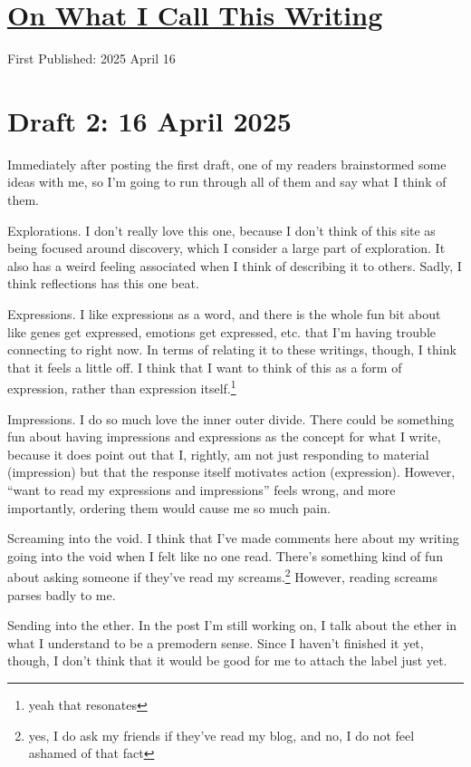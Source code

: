 \documentclass[12pt]{article}
\newcommand{\say}[1]{``#1''}
\renewcommand{\,}{\textsuperscript{,}}
\begin{document}
  
\doublespacing  
\section{\href{verbiage.html}{On What I Call This Writing}}  
First Published: 2025 April 16

\section{Draft 2: 16 April 2025}

Immediately after posting the first draft, one of my readers brainstormed some ideas with me, so I'm going to run through all of them and say what I think of them.

Explorations.  
I don't really love this one, because I don't think of this site as being focused around discovery, which I consider a large part of exploration.  
It also has a weird feeling associated when I think of describing it to others.  
Sadly, I think reflections has this one beat.

Expressions.  
I like expressions as a word, and there is the whole fun bit about like genes get expressed, emotions get expressed, etc. that I'm having trouble connecting to right now.  
In terms of relating it to these writings, though, I think that it feels a little off.  
I think that I want to think of this as a form of expression, rather than expression itself.\footnote{yeah that resonates}

Impressions.  
I do so much love the inner outer divide.  
There could be something fun about having impressions and expressions as the concept for what I write, because it does point out that I, rightly, am not just responding to material (impression) but that the response itself motivates action (expression).  
However, \say{want to read my expressions and impressions} feels wrong, and more importantly, ordering them would cause me so much pain.

Screaming into the void.  
I think that I've made comments here about my writing going into the void when I felt like no one read.  
There's something kind of fun about asking someone if they've read my screams.\footnote{yes, I do ask my friends if they've read my blog, and no, I do not feel ashamed of that fact}  
However, reading screams parses badly to me.

Sending into the ether.  
In the post I'm still working on, I talk about the ether in what I understand to be a premodern sense.  
Since I haven't finished it yet, though, I don't think that it would be good for me to attach the label just yet.
\end{document}
